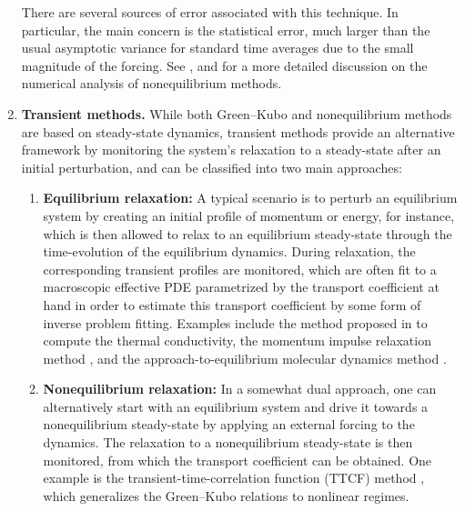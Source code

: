\begin{enumerate}
   There are several sources of error associated with this technique. In particular, the main concern is the statistical error, much larger than the usual asymptotic variance for standard time averages due to the small magnitude of the forcing. See \cite[Section 5]{lelievre2016}, \cite[Section 2]{spacek2023} and \cite[Section 3]{leimkuhler2016} for a more detailed discussion on the numerical analysis of nonequilibrium methods.
   
    \item {\bf Transient methods.} While both Green--Kubo and nonequilibrium methods are based on steady-state dynamics, transient methods provide an alternative framework by monitoring the system’s relaxation to a steady-state after an initial perturbation, and can be classified into two main approaches:
    
    \begin{enumerate}%
        \item {\bf Equilibrium relaxation:} A typical scenario is to perturb an equilibrium system by creating an initial profile of momentum or energy, for instance, which is then allowed to relax to an equilibrium steady-state through the time-evolution of the equilibrium dynamics. During relaxation, the corresponding transient profiles are monitored, which are often fit to a macroscopic effective PDE parametrized by the transport coefficient at hand in order to estimate this transport coefficient by some form of inverse problem fitting. Examples include the method proposed in \cite{hulse2005} to compute the thermal conductivity, the momentum impulse relaxation method \cite{arya2000}, and the approach-to-equilibrium molecular dynamics method \cite{lampin2013}.
                
        \item {\bf Nonequilibrium relaxation:} In a somewhat dual approach, one can alternatively start with an equilibrium system and drive it towards a nonequilibrium steady-state by applying an external forcing to the dynamics. The relaxation to a nonequilibrium steady-state is then monitored, from which the transport coefficient can be obtained. One example is the transient-time-correlation function (TTCF) method \cite{morriss1987,evans1988}, which generalizes the Green--Kubo relations to nonlinear regimes.
    \end{enumerate}
\end{enumerate}
%
